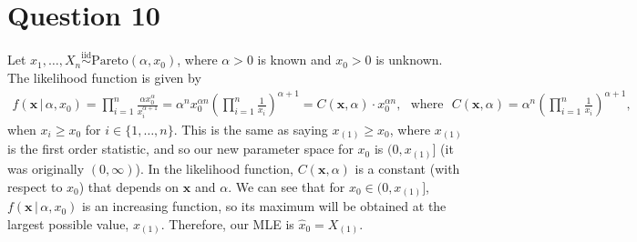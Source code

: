 \documentclass[10pt]{article}
\begin{document}
\section{Question 10} \noindent
Let \(x_1, \ldots, X_n \overset{\text{iid}}{\sim} \mathrm{Pareto}(\alpha, x_0)\), where \(\alpha > 0\) is known and \(x_0 > 0\) is unknown. The likelihood 
function is given by 
\begin{align*}
    f(\mathbf{x} \,|\, \alpha, x_0) 
    = \prod_{i=1}^n \frac{\alpha x_0^{\alpha}}{x_i^{\alpha + 1}}
    = \alpha^n x_0^{\alpha n} \left( \prod_{i=1}^n \frac{1}{x_i} \right)^{\alpha + 1}
    = C(\mathbf{x}, \alpha) \cdot x_0^{\alpha n},
    ~~~\text{where}~~~
    C(\mathbf{x}, \alpha) = \alpha^n \left( \prod_{i=1}^n \frac{1}{x_i} \right)^{\alpha + 1},
\end{align*}
when \(x_i \ge x_0\) for \(i \in \{1, \ldots, n\}\). 
This is the same as saying \(x_{(1)} \ge x_0\), where \(x_{(1)}\) is the first order statistic, and so 
our new parameter space for \(x_0\) is \((0, x_{(1)}]\) (it was originally \((0, \infty)\)).
In the likelihood function, \(C(\mathbf{x}, \alpha)\) is a constant (with respect to \(x_0\)) that depends on \(\mathbf{x}\) and \(\alpha\). 
We can see that for \(x_0 \in (0, x_{(1)}]\), \(f(\mathbf{x} \,|\, \alpha, x_0)\) is an increasing function, so its maximum will be obtained 
at the largest possible value, \(x_{(1)}\). Therefore, our MLE is \(\hat{x}_0 = X_{(1)}\). 
\end{document}

